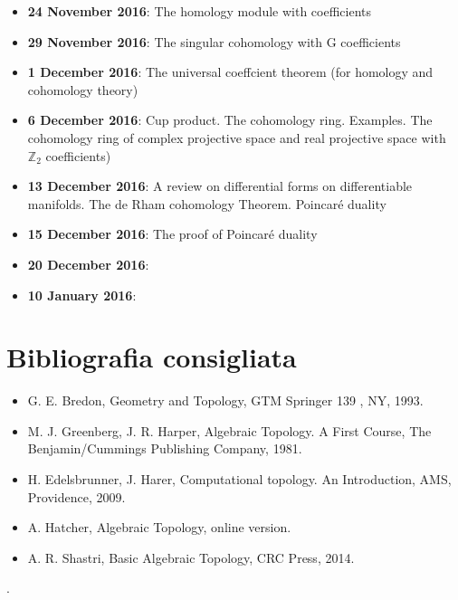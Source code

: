 \documentclass[10pt, twoside=false, x11names]{scrbook}
\newcommand{\Z}{\mathbb{Z}}
\begin{document}
\begin{itemize}
\item \textbf{24 November 2016}: The homology module with coefficients
\item \textbf{29 November 2016}: The singular cohomology with G coefficients
\item \textbf{1 December 2016}: The universal coeffcient theorem (for homology and cohomology theory)
\item \textbf{6 December 2016}: Cup product. The cohomology ring. Examples. The cohomology ring of complex projective space and real projective space with $ \Z_2 $ coefficients)
\item \textbf{13 December 2016}: A review on differential forms on differentiable manifolds. The de Rham cohomology Theorem. Poincaré duality
\item \textbf{15 December 2016}: The proof of Poincaré duality
\item \textbf{20 December 2016}:
\item \textbf{10 January 2016}:
\end{itemize}

\section*{Bibliografia consigliata}

\begin{itemize}
\item G. E. Bredon, Geometry and Topology, GTM Springer 139 , NY, 1993.
\item M. J. Greenberg, J. R. Harper, Algebraic Topology. A First Course, The Benjamin/Cummings Publishing Company, 1981.
\item H. Edelsbrunner, J. Harer, Computational topology. An Introduction, AMS, Providence, 2009.
\item A. Hatcher, Algebraic Topology, online version.
\item A. R. Shastri, Basic Algebraic Topology, CRC Press, 2014.
\end{itemize}


\tableofcontents
{}
\printsymblist

                             .




\printindex
\end{document}
